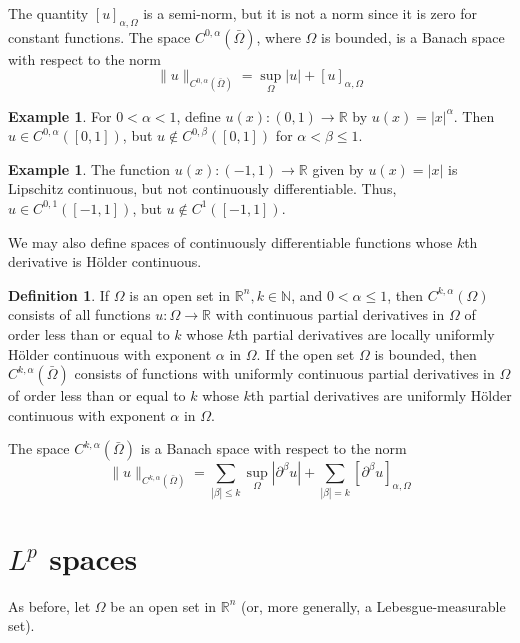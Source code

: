 \documentclass[10pt]{article}
\theoremstyle{plain}
\theoremstyle{definition}
\newtheorem{definition}[theorem]{Definition}
\newtheorem{example}[theorem]{Example}
\theoremstyle{remark}
\begin{document}
The quantity $[u]_{\alpha, \Omega}$ is a semi-norm, but it is not a norm since it is zero for constant functions. The space $C^{0, \alpha}(\bar{\Omega})$, where $\Omega$ is bounded, is a Banach space with respect to the norm
$$
\|u\|_{C^{0, \alpha}(\bar{\Omega})}=\sup_{\Omega}|u|+[u]_{\alpha, \Omega}
$$

\begin{example}
For $0<\alpha<1$, define $u(x):(0,1) \rightarrow \mathbb{R}$ by $u(x)=|x|^{\alpha}$. Then $u \in C^{0, \alpha}([0,1])$, but $u \notin C^{0, \beta}([0,1])$ for $\alpha<\beta \leq 1$.
\end{example}

\begin{example}
The function $u(x):(-1,1) \rightarrow \mathbb{R}$ given by $u(x)=|x|$ is Lipschitz continuous, but not continuously differentiable. Thus, $u \in C^{0,1}([-1,1])$, but $u \notin C^{1}([-1,1])$.
\end{example}

We may also define spaces of continuously differentiable functions whose $k$th derivative is Hölder continuous.

\begin{definition}
If $\Omega$ is an open set in $\mathbb{R}^{n}, k \in \mathbb{N}$, and $0<\alpha \leq 1$, then $C^{k, \alpha}(\Omega)$ consists of all functions $u: \Omega \rightarrow \mathbb{R}$ with continuous partial derivatives in $\Omega$ of order less than or equal to $k$ whose $k$th partial derivatives are locally uniformly Hölder continuous with exponent $\alpha$ in $\Omega$. If the open set $\Omega$ is bounded, then $C^{k, \alpha}(\bar{\Omega})$ consists of functions with uniformly continuous partial derivatives in $\Omega$ of order less than or equal to $k$ whose $k$th partial derivatives are uniformly Hölder continuous with exponent $\alpha$ in $\Omega$.
\end{definition}

The space $C^{k, \alpha}(\bar{\Omega})$ is a Banach space with respect to the norm
$$
\|u\|_{C^{k, \alpha}(\bar{\Omega})}=\sum_{|\beta| \leq k} \sup_{\Omega}\left|\partial^{\beta} u\right|+\sum_{|\beta|=k}\left[\partial^{\beta} u\right]_{\alpha, \Omega}
$$

\section{$L^{p}$ spaces}
As before, let $\Omega$ be an open set in $\mathbb{R}^{n}$ (or, more generally, a Lebesgue-measurable set).
\end{document}
